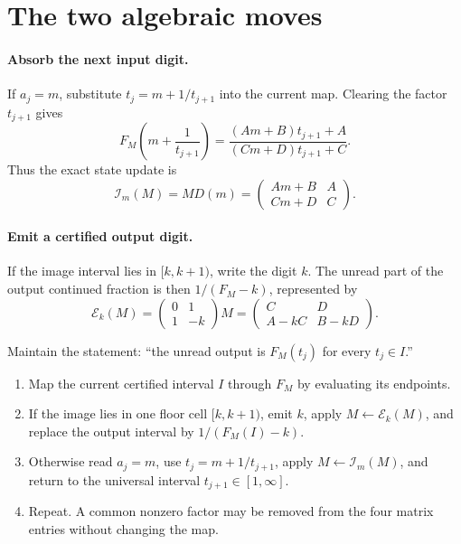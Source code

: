 \section{The two algebraic moves}

\paragraph{Absorb the next input digit.}
If $a_j=m$, substitute $t_j=m+1/t_{j+1}$ into the current map.  Clearing the
factor $t_{j+1}$ gives
\[
 F_M\left(m+\frac1{t_{j+1}}\right)
 =\frac{(Am+B)t_{j+1}+A}{(Cm+D)t_{j+1}+C}.
\]
Thus the exact state update is
\begin{equation}
  \boxed{\mathcal I_m(M)=M D(m)
  =\begin{pmatrix}Am+B&A\\Cm+D&C\end{pmatrix}.}    \label{eq:unary-absorb}
\end{equation}

\paragraph{Emit a certified output digit.}
If the image interval lies in $[k,k+1)$, write the digit $k$.  The unread part
of the output continued fraction is then $1/(F_M-k)$, represented by
\begin{equation}
  \boxed{\mathcal E_k(M)=
  \begin{pmatrix}0&1\\1&-k\end{pmatrix}M
  =\begin{pmatrix}C&D\\A-kC&B-kD\end{pmatrix}.}   \label{eq:unary-emit}
\end{equation}

\begin{checkpoint}[title={The homographic loop}]
Maintain the statement: ``the unread output is $F_M(t_j)$ for every
$t_j\in I$.''
\begin{enumerate}
  \item Map the current certified interval $I$ through $F_M$ by evaluating its
  endpoints.
  \item If the image lies in one floor cell $[k,k+1)$, emit $k$, apply
  $M\leftarrow\mathcal E_k(M)$, and replace the output interval by
  $1/(F_M(I)-k)$.
  \item Otherwise read $a_j=m$, use $t_j=m+1/t_{j+1}$, apply
  $M\leftarrow\mathcal I_m(M)$, and return to the universal interval
  $t_{j+1}\in[1,\infty]$.
  \item Repeat.  A common nonzero factor may be removed from the four matrix
  entries without changing the map.
\end{enumerate}
\end{checkpoint}


